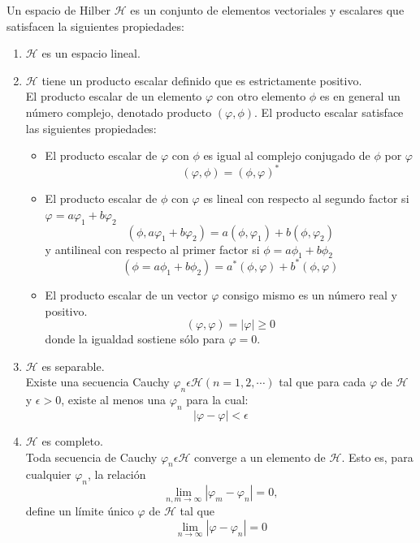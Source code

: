 \documentclass[12pt,letterpaper]{report}
\begin{document}
Un espacio de Hilber $\mathcal{H}$ es un conjunto de elementos vectoriales y escalares
que satisfacen la siguientes propiedades:
\begin{enumerate}
    \item $\mathcal{H}$ es un espacio lineal.
    \item $\mathcal{H}$ tiene un producto escalar definido que es estrictamente positivo.\\
    El producto escalar de un elemento $\varphi$ con otro elemento $\phi$ es en general un número complejo, denotado producto
    $(\varphi,\phi)$. El producto escalar satisface las siguientes propiedades:
    \begin{itemize}
        \item El producto escalar de $\varphi$ con $\phi$ es igual al complejo conjugado de $\phi$ por $\varphi$
        \begin{equation*}
            (\varphi,\phi)=(\phi,\varphi)^*
        \end{equation*}
        \item El producto escalar de $\phi$ con $\varphi$ es lineal con respecto al segundo factor si $\varphi=a\varphi_1+b\varphi_2$
        \begin{equation*}
            (\phi,a\varphi_1+b\varphi_2) =a (\phi,\varphi_1)+b(\phi,\varphi_2)
        \end{equation*}
        y antilineal con respecto al primer factor si $\phi=a\phi_1+b\phi_2$
        \begin{equation*}
            (\phi=a\phi_1+b\phi_2)=a^*(\phi,\varphi)+b^* (\phi,\varphi)
        \end{equation*}
        \item El producto escalar de un vector $\varphi$ consigo mismo es un número real y positivo.
        \begin{equation*}
            (\varphi,\varphi)=|\varphi| \geq 0
                \end{equation*}
        donde la igualdad sostiene sólo para $\varphi=0$.
    \end{itemize}
    \item $\mathcal{H}$ es separable.\\
    Existe una secuencia Cauchy $\varphi_n \epsilon \mathcal{H}(n=1,2,\cdots)$ tal que para cada $\varphi$ de $\mathcal{H}$ y $\epsilon > 0$, existe
    al menos una $\varphi_n$ para la cual:
    \begin{equation*}
        |\varphi-\varphi|<\epsilon
    \end{equation*}
    \item $\mathcal{H}$ es completo.\\
    Toda secuencia de Cauchy $\varphi_n \epsilon \mathcal{H}$ converge a un elemento de $\mathcal{H}$. Esto es, para cualquier $\varphi_n$, la relación 
    \begin{equation*}
        \lim_{n,m\rightarrow \infty} |\varphi_m-\varphi_n|=0,
    \end{equation*}
    define un límite único $\varphi$ de $\mathcal{H}$ tal que
    \begin{equation*}
        \lim_{n\rightarrow \infty} |\varphi-\varphi_n|=0
    \end{equation*}
\end{enumerate}
\end{document}
